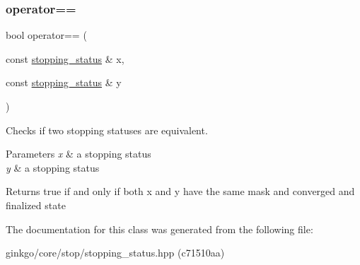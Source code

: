 \subsubsection{\texorpdfstring{operator==}{operator==}}
{\footnotesize\ttfamily bool operator== (\begin{DoxyParamCaption}\item[{const \hyperlink{classgko_1_1stopping__status}{stopping\+\_\+status} \&}]{x,  }\item[{const \hyperlink{classgko_1_1stopping__status}{stopping\+\_\+status} \&}]{y }\end{DoxyParamCaption})\hspace{0.3cm}{\ttfamily [friend]}}



Checks if two stopping statuses are equivalent. 


\begin{DoxyParams}{Parameters}
{\em x} & a stopping status \\
\hline
{\em y} & a stopping status\\
\hline
\end{DoxyParams}
\begin{DoxyReturn}{Returns}
true if and only if both {\ttfamily x} and {\ttfamily y} have the same mask and converged and finalized state 
\end{DoxyReturn}


The documentation for this class was generated from the following file\+:\begin{DoxyCompactItemize}
\item 
ginkgo/core/stop/stopping\+\_\+status.\+hpp (c71510aa)\end{DoxyCompactItemize}
